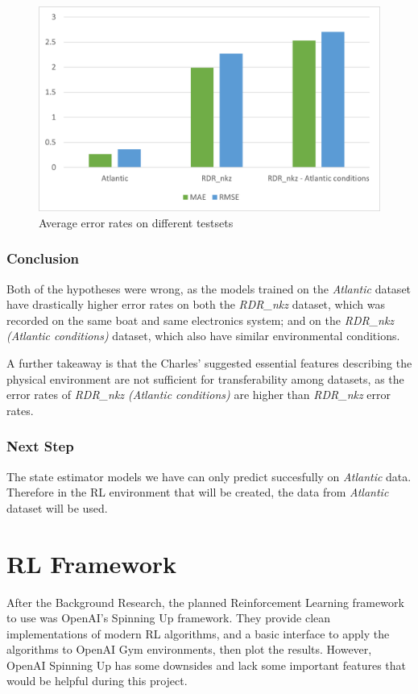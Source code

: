 \documentclass[12pt,twoside]{report}
\begin{document}
\begin{figure}[htbp]
\centering
\includegraphics[width = \hsize]{figures/transferability/transferability chart.png}
\caption{Average error rates on different testsets}
\label{fig:transferability-avg-chart}
\end{figure}

\subsubsection{Conclusion}
Both of the hypotheses were wrong, as the models trained on the \textit{Atlantic} dataset have drastically higher error rates on both the \textit{RDR\_nkz} dataset, which was recorded on the same boat and same electronics system; and on the \textit{RDR\_nkz (Atlantic conditions)} dataset, which also have similar environmental conditions.

A further takeaway is that the Charles' suggested essential features describing the physical environment are not sufficient for transferability among datasets, as the error rates of \textit{RDR\_nkz (Atlantic conditions)} are higher than \textit{RDR\_nkz} error rates.

\subsubsection{Next Step}
The state estimator models we have can only predict succesfully on \textit{Atlantic} data. Therefore in the RL environment that will be created, the data from \textit{Atlantic} dataset will be used.

\section{RL Framework}
After the Background Research, the planned Reinforcement Learning framework to use was OpenAI's Spinning Up framework. They provide clean implementations of modern RL algorithms, and a basic interface to apply the algorithms to OpenAI Gym environments, then plot the results. However, OpenAI Spinning Up has some downsides and lack some important features that would be helpful during this project.
\end{document}
